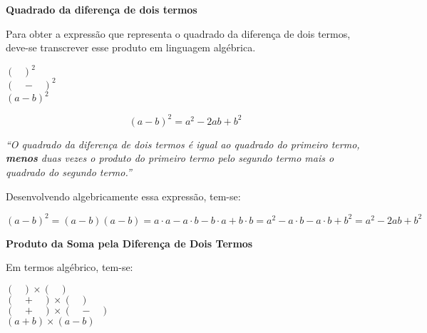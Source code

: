     \noindent
	\textbf{Quadrado da diferença de dois termos}
 
	Para obter a expressão que representa o quadrado da diferença de dois termos, deve-se transcrever esse produto em linguagem algébrica.

        \begin{tcolorbox}[colback=white,colframe=minha_cor,coltitle=black,title=O quadrado da diferença de dois termos] 
        \centering
         $( \;\;\;)^2$ \\[0.25cm]
         $(\;\;\;-\;\;\;)^2$ \\[0.25cm]
         $( a - b )^2$ 
        \end{tcolorbox}
	
	\[
	( a - b )^2 = a^2 - 2ab + b^2
	\]
	
	\textit{“O quadrado da diferença de dois termos é igual ao quadrado do primeiro termo, \textbf{menos} duas vezes o produto do primeiro termo pelo segundo termo mais o quadrado do segundo termo.''}
	
	Desenvolvendo algebricamente essa expressão, tem-se:
 
	\[
	( a - b )^2 = ( a - b )( a - b ) = a \cdot a - a \cdot b - b \cdot a + b \cdot b = a^2 - a \cdot b - a \cdot b + b^2 = a^2 - 2ab + b^2
	\]

        \begin{texample}
        \centering
        \end{texample} 

    \noindent
	\textbf{Produto da Soma pela Diferença de Dois Termos}
	
	Em termos algébrico, tem-se:
	\begin{tcolorbox}[colback=white,colframe=minha_cor,coltitle=black,title=Produto da Soma pela Diferença de Dois Termos] 
        \centering
         $( \;\;\;) \times ( \;\;\;) $ \\[0.25cm]
         $(\;\;\;+\;\;\;) \times ( \;\;\;)$ \\[0.25cm]
         $(\;\;\;+\;\;\;) \times (\;\;\;-\;\;\;)$ \\[0.25cm]
         $( a + b ) \times ( a - b )$
        \end{tcolorbox}
	
